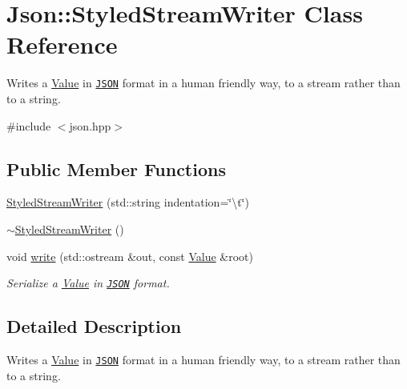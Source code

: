 \hypertarget{class_json_1_1_styled_stream_writer}{\section{Json\-:\-:Styled\-Stream\-Writer Class Reference}
\label{class_json_1_1_styled_stream_writer}
}


Writes a \hyperlink{class_json_1_1_value}{Value} in \href{http://www.json.org}{\tt J\-S\-O\-N} format in a human friendly way, to a stream rather than to a string.  




{\ttfamily \#include $<$json.\-hpp$>$}

\subsection*{Public Member Functions}
\begin{DoxyCompactItemize}
\item 
\hyperlink{class_json_1_1_styled_stream_writer_ae87567a08de865b6dc84d7218a3001df}{Styled\-Stream\-Writer} (std\-::string indentation=\char`\"{}\textbackslash{}t\char`\"{})
\item 
\hyperlink{class_json_1_1_styled_stream_writer_a17444a59f617970279714e97b0ddfa46}{$\sim$\-Styled\-Stream\-Writer} ()
\item 
void \hyperlink{class_json_1_1_styled_stream_writer_a07807741c6c43ecd35885a87234d0805}{write} (std\-::ostream \&out, const \hyperlink{class_json_1_1_value}{Value} \&root)
\begin{DoxyCompactList}\small\item\em Serialize a \hyperlink{class_json_1_1_value}{Value} in \href{http://www.json.org}{\tt J\-S\-O\-N} format. \end{DoxyCompactList}\end{DoxyCompactItemize}


\subsection{Detailed Description}
Writes a \hyperlink{class_json_1_1_value}{Value} in \href{http://www.json.org}{\tt J\-S\-O\-N} format in a human friendly way, to a stream rather than to a string. 

